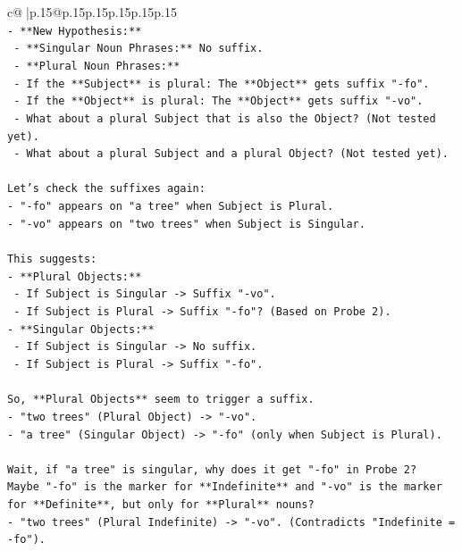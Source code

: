 \documentclass{article}
\begin{document}
{\begin{supertabular}{c@{$\;$}|p{.15\linewidth}@{}p{.15\linewidth}p{.15\linewidth}p{.15\linewidth}p{.15\linewidth}p{.15\linewidth}}
{{{\\ 
\texttt{{-} **New Hypothesis:**} \\
\texttt{  {-} **Singular Noun Phrases:** No suffix.} \\
\texttt{  {-} **Plural Noun Phrases:**} \\
\texttt{    {-} If the **Subject** is plural: The **Object** gets suffix "{-}fo".} \\
\texttt{    {-} If the **Object** is plural: The **Object** gets suffix "{-}vo".} \\
\texttt{    {-} What about a plural Subject that is also the Object? (Not tested yet).} \\
\texttt{    {-} What about a plural Subject and a plural Object? (Not tested yet).} \\
\\ 
\texttt{Let's check the suffixes again:} \\
\texttt{{-} "{-}fo" appears on "a tree" when Subject is Plural.} \\
\texttt{{-} "{-}vo" appears on "two trees" when Subject is Singular.} \\
\\ 
\texttt{This suggests:} \\
\texttt{{-} **Plural Objects:**} \\
\texttt{  {-} If Subject is Singular {-}> Suffix "{-}vo".} \\
\texttt{  {-} If Subject is Plural {-}> Suffix "{-}fo"? (Based on Probe 2).} \\
\texttt{{-} **Singular Objects:**} \\
\texttt{  {-} If Subject is Singular {-}> No suffix.} \\
\texttt{  {-} If Subject is Plural {-}> Suffix "{-}fo".} \\
\\ 
\texttt{So, **Plural Objects** seem to trigger a suffix.} \\
\texttt{{-} "two trees" (Plural Object) {-}> "{-}vo".} \\
\texttt{{-} "a tree" (Singular Object) {-}> "{-}fo" (only when Subject is Plural).} \\
\\ 
\texttt{Wait, if "a tree" is singular, why does it get "{-}fo" in Probe 2?} \\
\texttt{Maybe "{-}fo" is the marker for **Indefinite** and "{-}vo" is the marker for **Definite**, but only for **Plural** nouns?} \\
\texttt{{-} "two trees" (Plural Indefinite) {-}> "{-}vo". (Contradicts "Indefinite = {-}fo").} \\
}}}
\end{supertabular}}
\end{document}
